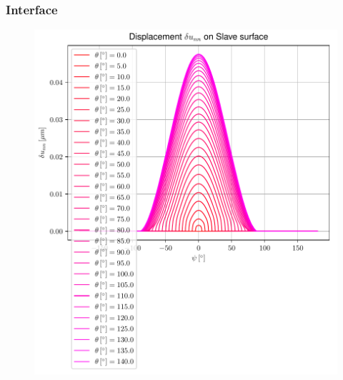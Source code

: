 \documentclass[first,firstsupp,lastsupp,handout,last,hyperref,table]{ETHclass}
\begin{document}
\begin{frame}
\frametitle{\vspace{0.35cm}\scriptsize Interface}
\vspace{-0.85cm}
\begin{figure}
\includegraphics[height=0.9\textheight]{2017-03-03_AbqRunSummary_AllNormalDispsOnSlave.pdf}
\end{figure}
\end{frame}
\end{document}
